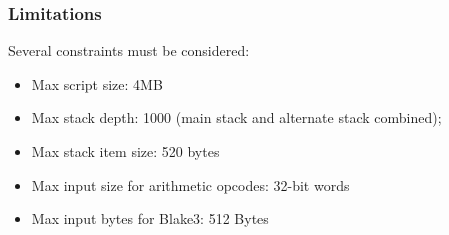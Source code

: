 \subsubsection{Limitations}

Several constraints must be considered:
\begin{itemize}
    \item Max script size: 4MB
    \item Max stack depth: 1000 (main stack and alternate stack combined);
    \item Max stack item size: 520 bytes
    \item Max input size for arithmetic opcodes: 32-bit words
    \item Max input bytes for Blake3: 512 Bytes
\end{itemize}
